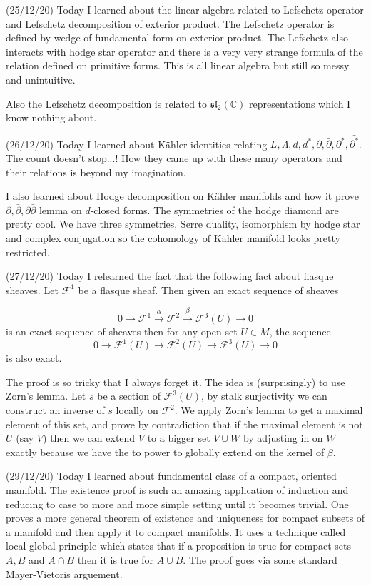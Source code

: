 \documentclass[12pt,a4paper]{article}
\begin{document}
(25/12/20) Today I learned about the linear algebra related to Lefschetz operator and Lefschetz decomposition of exterior product. The Lefschetz operator is defined by wedge of fundamental form on exterior product. The Lefschetz also interacts with hodge star operator and there is a very very strange formula of the relation defined on primitive forms. This is all linear algebra but still so messy and unintuitive.

Also the Lefschetz decomposition is related to $\mathfrak{sl}_2(\mathbb{C})$ representations which I know nothing about.

(26/12/20) Today I learned about K\"{a}hler identities relating $L, \Lambda, d,d^*, \partial, \bar{\partial}, \partial^*, \bar{\partial^*}$. The count doesn't stop...! How they came up with these many operators and their relations is beyond my imagination. 

I also learned about Hodge decomposition on K\"{a}hler manifolds and how it prove $\partial,\bar{\partial},\partial\bar{\partial} $ lemma on $d$-closed forms. The symmetries of the hodge diamond are pretty cool. We have three symmetries, Serre duality, isomorphism by hodge star and complex conjugation so the cohomology of K\"{a}hler manifold looks pretty restricted.

(27/12/20) Today I relearned the fact that the following fact about flasque sheaves. Let $\mathcal{F}^1$ be a flasque sheaf. Then given an exact sequence of sheaves 

\[ 0 \rightarrow \mathcal{F}^1 \xrightarrow{\alpha} \mathcal{F}^2 \xrightarrow{\beta} \mathcal{F}^3(U) \rightarrow 0 \]
 is an exact sequence of sheaves then for any open set $U \in M$, the sequence 
 \[  0 \longrightarrow \mathcal{F}^1(U) \longrightarrow \mathcal{F}^2(U) \longrightarrow \mathcal{F}^3(U) \longrightarrow 0 \]
 is also exact.
 
 The proof is so tricky that I always forget it. The idea is (surprisingly) to use Zorn's lemma. Let $s$ be a section of $\mathcal{F}^3(U)$, by stalk surjectivity we can construct an inverse of $s$ locally on $\mathcal{F}^2$. We apply Zorn's lemma to get a maximal element of this set, and prove by contradiction that if the maximal element is not $U$ (say $V$) then we can extend $V$ to a bigger set $V \cup W$ by adjusting in on $W$ exactly because we have the to power to globally extend on the kernel of $\beta$.
 
 (29/12/20) Today I learned about fundamental class of a compact, oriented manifold. The existence proof is such an amazing application of induction and reducing to case to more and more simple setting until it becomes trivial. One proves a more general theorem of existence and uniqueness for compact subsets of a manifold and then apply it to compact manifolds. It uses a technique called local global principle which states that if a proposition is true for compact sets $A,B$ and $A\cap B$ then it is true for $A\cup B$. The proof goes via some standard Mayer-Vietoris arguement.
 
\end{document}
